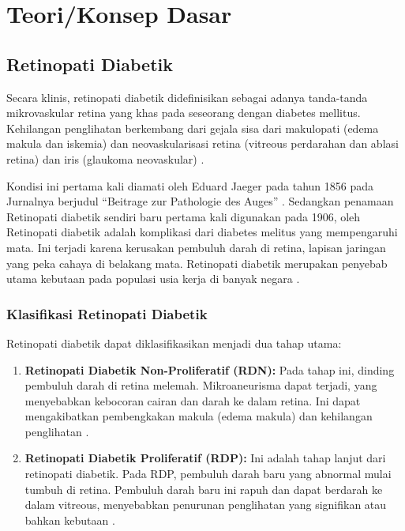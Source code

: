 \section{Teori/Konsep Dasar}
\label{sec:22}

\subsection{Retinopati Diabetik}
Secara klinis, retinopati diabetik didefinisikan sebagai adanya tanda-tanda mikrovaskular retina yang khas pada seseorang dengan diabetes mellitus. Kehilangan penglihatan berkembang dari gejala sisa dari makulopati (edema makula dan iskemia) dan neovaskularisasi retina (vitreous perdarahan dan ablasi retina) dan iris (glaukoma neovaskular) \parencite{Cheung2010}. 

Kondisi ini pertama kali diamati oleh Eduard Jaeger pada tahun 1856 pada Jurnalnya berjudul “Beitrage zur Pathologie des Auges” \parencite{jaeger1855}. Sedangkan penamaan Retinopati diabetik sendiri baru pertama kali digunakan pada 1906, oleh 
Retinopati diabetik adalah komplikasi dari diabetes melitus yang mempengaruhi mata. Ini terjadi karena kerusakan pembuluh darah di retina, lapisan jaringan yang peka cahaya di belakang mata. Retinopati diabetik merupakan penyebab utama kebutaan pada populasi usia kerja di banyak negara \parencite{fong2004diabetic}.

\subsubsection{Klasifikasi Retinopati Diabetik}

Retinopati diabetik dapat diklasifikasikan menjadi dua tahap utama:

\begin{enumerate}
    \item \textbf{Retinopati Diabetik Non-Proliferatif (RDN):} Pada tahap ini, dinding pembuluh darah di retina melemah. Mikroaneurisma dapat terjadi, yang menyebabkan kebocoran cairan dan darah ke dalam retina. Ini dapat mengakibatkan pembengkakan makula (edema makula) dan kehilangan penglihatan \parencite{aiello1998diabetic}.
    \item \textbf{Retinopati Diabetik Proliferatif (RDP):} Ini adalah tahap lanjut dari retinopati diabetik. Pada RDP, pembuluh darah baru yang abnormal mulai tumbuh di retina. Pembuluh darah baru ini rapuh dan dapat berdarah ke dalam vitreous, menyebabkan penurunan penglihatan yang signifikan atau bahkan kebutaan \parencite{king1998diabetes}.
\end{enumerate}

